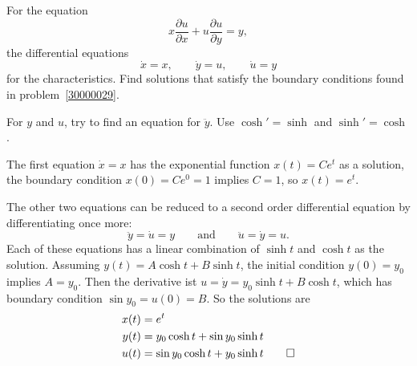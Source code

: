 For the equation 
\[
x
\frac{\partial u}{\partial x}
+
u
\frac{\partial u}{\partial y}
=
y,
\]
the differential equations
\[
\dot{x} = x,\qquad
\dot{y} = u,\qquad
\dot{u} = y
\]
for the characteristics.
Find solutions that satisfy the boundary conditions found in
problem~\ref{30000029}.

\begin{hinweis}
For $y$ and $u$, try to find an equation for $\ddot{y}$. 
Use $\cosh'=\sinh$ and $\sinh'=\cosh$.
\end{hinweis}

\begin{loesung}
The first equation $\dot{x}=x$ has the exponential function $x(t)=Ce^t$
as a solution, the boundary condition $x(0)=Ce^0 = 1$ implies $C=1$, so
$x(t)=e^t$.

The other two equations can be reduced to a second order differential
equation by differentiating once more:
\[
\ddot{y}=\dot{u}=y
\qquad\text{and}\qquad
\ddot{u}=\dot{y}=u.
\]
Each of these equations has a linear combination of $\sinh t$ and $\cosh t$
as the solution.
Assuming $y(t) = A\cosh t + B \sinh t$, the initial condition $y(0)=y_0$
implies $A=y_0$.
Then the derivative ist $u=\dot{y}=y_0\sinh t+B\cosh t$, which has
boundary condition $\sin y_0 = u(0) = B$.
So the solutions are
\begin{align*}
x(t) &= e^t \\
y(t) &= y_0 \cosh t + \sin y_0 \sinh t \\
u(t) &= \sin y_0 \cosh t + y_0 \sinh t
\qedhere
\end{align*}
\end{loesung}
